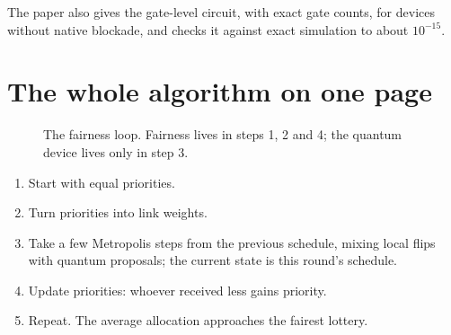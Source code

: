 \documentclass[11pt,a4paper]{article}
\begin{document}
\noindent The paper also gives the gate-level circuit, with exact gate counts, for devices without
native blockade, and checks it against exact simulation to about $10^{-15}$.

\clearpage
\section{The whole algorithm on one page}

\begin{figure}[!h]
\centering
{}
\caption{The fairness loop. Fairness lives in steps 1, 2 and 4; the quantum device lives only in step 3.}
\end{figure}

\begin{enumerate}[leftmargin=*]
\item Start with equal priorities.
\item Turn priorities into link weights.
\item Take a few Metropolis steps from the previous schedule, mixing local flips with quantum proposals;
the current state is this round's schedule.
\item Update priorities: whoever received less gains priority.
\item Repeat. The average allocation approaches the fairest lottery.
\end{enumerate}
\end{document}

